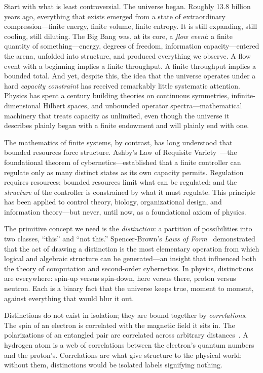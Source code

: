 \documentclass[11pt]{article}
\theoremstyle{remark}
\begin{document}
Start with what is least controversial.  The universe began.  Roughly 13.8 billion years ago, everything that exists emerged from a state of extraordinary compression---finite energy, finite volume, finite entropy.  It is still expanding, still cooling, still diluting.  The Big Bang was, at its core, a \emph{flow event}: a finite quantity of something---energy, degrees of freedom, information capacity---entered the arena, unfolded into structure, and produced everything we observe.  A flow event with a beginning implies a finite throughput.  A finite throughput implies a bounded total.  And yet, despite this, the idea that the universe operates under a hard \emph{capacity constraint} has received remarkably little systematic attention.  Physics has spent a century building theories on continuous symmetries, infinite-dimensional Hilbert spaces, and unbounded operator spectra---mathematical machinery that treats capacity as unlimited, even though the universe it describes plainly began with a finite endowment and will plainly end with one.

The mathematics of finite systems, by contrast, has long understood that bounded resources force structure.  Ashby's Law of Requisite Variety~\cite{Ashby1956}---the foundational theorem of cybernetics---established that a finite controller can regulate only as many distinct states as its own capacity permits.  Regulation requires resources; bounded resources limit what can be regulated; and the \emph{structure} of the controller is constrained by what it must regulate.  This principle has been applied to control theory, biology, organizational design, and information theory---but never, until now, as a foundational axiom of physics.

The primitive concept we need is the \emph{distinction}: a partition of possibilities into two classes, ``this'' and ``not this.''  Spencer-Brown's \emph{Laws of Form}~\cite{SpencerBrown1969} demonstrated that the act of drawing a distinction is the most elementary operation from which logical and algebraic structure can be generated---an insight that influenced both the theory of computation and second-order cybernetics.  In physics, distinctions are everywhere: spin-up versus spin-down, here versus there, proton versus neutron.  Each is a binary fact that the universe keeps true, moment to moment, against everything that would blur it out.

Distinctions do not exist in isolation; they are bound together by \emph{correlations}.  The spin of an electron is correlated with the magnetic field it sits in.  The polarizations of an entangled pair are correlated across arbitrary distances~\cite{Bell1964}.  A hydrogen atom is a web of correlations between the electron's quantum numbers and the proton's.  Correlations are what give structure to the physical world; without them, distinctions would be isolated labels signifying nothing.
\end{document}
